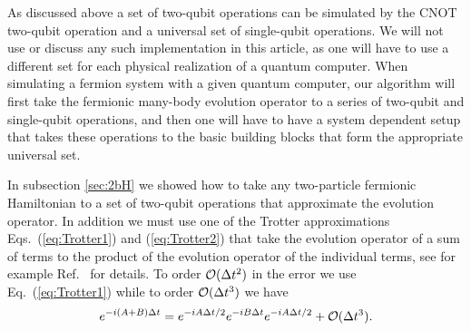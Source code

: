 \documentclass[aps,pra,twocolumn,floatfix]{revtex4}
\begin{document}
As discussed above a set of two-qubit
operations can be simulated by the CNOT two-qubit operation and a
universal set of single-qubit operations. 
We will not use or discuss any such
implementation in this article, as one will have to use a different
set for each physical realization of a quantum computer. When
simulating a fermion system with a given
quantum computer, our algorithm  will first take the
fermionic many-body evolution operator to a series of two-qubit and
single-qubit operations, and then one will have to have a system
dependent setup that takes these operations to the basic building
blocks that form the appropriate universal set.

In subsection \ref{sec:2bH} we showed how to take any two-particle
fermionic Hamiltonian to a set of two-qubit operations that
approximate 
the evolution operator.
In addition we must use one of the Trotter approximations  \cite{trotter1959,suzukitrotter,suzuki1985}
Eqs.~(\ref{eq:Trotter1}) and  (\ref{eq:Trotter2})  that take
the evolution operator of a sum of terms to the product of the
evolution operator of the individual terms,
see for example Ref.~\cite{nielsen2000} for details. To order ${\cal O}(\Delta
t^2)$ in the error  we use Eq.~(\ref{eq:Trotter1})
while to order ${\cal O} (\Delta t^3)$ we have
\begin{equation}
	\label{eq:Trotter2} 
	e^{-i(A+B)\Delta t}=e^{-iA\Delta
	t/2}e^{-iB\Delta t}e^{-iA\Delta t/2} + {\cal O} (\Delta t^3).
\end{equation}
\end{document}
